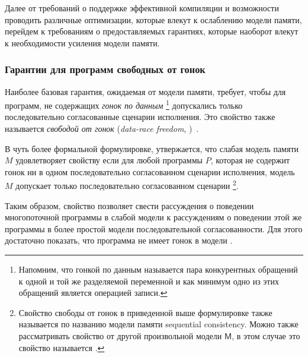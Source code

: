Далее от требований о поддержке эффективной компиляции
и возможности проводить различные оптимизации, 
которые влекут к ослаблению модели памяти,
перейдем к требованиям о предоставляемых гарантиях, 
которые наоборот влекут к необходимости усиления модели памяти.

\subsubsection*{Гарантии для программ свободных от гонок}

Наиболее базовая гарантия, ожидаемая от модели памяти, 
требует, чтобы для программ, не содержащих \emph{гонок по данным}%
\footnote{Напомним, что гонкой по данным называется пара конкурентных 
обращений к одной и той же разделяемой переменной 
и как минимум одно из этих обращений является операцией записи.} 
допускались только последовательно согласованные сценарии исполнения. 
Это свойство также называется \emph{свободой от гонок}
(\emph{data-race freedom}, \DRF)~\cite{Manson-al:POPL05}.

В чуть более формальной формулировке, утвержается, 
что слабая модель памяти $M$ удовлетворяет свойству \DRF
если для любой программы $P$, которая не содержит 
гонок ни в одном последовательно согласованном сценарии исполнения,
модель $M$ допускает только последовательно согласованном сценарии%
\footnote{Свойство свободы от гонок в приведенной выше формулировке
также называется  по названию модели памяти 
sequential consistency. 
Можно также рассматривать свойство \DRF от другой 
произвольной модели $\mathsf{M}$, в этом случае это 
свойство называется .}.

Таким образом, свойство \DRF позволяет свести рассуждения о поведении 
многопоточной программы в слабой модели к рассуждениям о поведении 
этой же программы в более простой модели последовательной согласованности.
Для этого достаточно показать, что программа не имеет гонок в модели \SC. 






